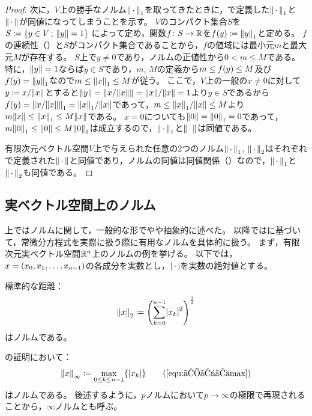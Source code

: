 \documentclass[b5paper,oneside,openany]{ltjsbook} %
\begin{document}
\begin{thm}
\begin{proof}
        次に，$V$上の勝手なノルム$\norm{\dummy}_1$を取ってきたときに，で定義した$\norm{\dummy}_1$と$\norm{\dummy}$が同値になってしまうことを示す。
        $V$のコンパクト集合$S$を$S\coloneqq \sset{y\in V}{\norm{y}=1}$
        によって定め，関数$f\colon S\to \mathbb{R}$を$\fun{f}{y}\coloneqq \norm{y}_1$と定める。
        $f$の連続性（）と$S$がコンパクト集合であることから，$f$の値域には最小元$m$と最大元$M$が存在する。
        $S$上で$y\ne {0}$であり，ノルムの正値性から$0<m\leq M$である。
        特に，$\norm{y}=1$ならば$y\in S$であり，$m$, $M$の定義から$m\leq \fun{f}{y}\leq M$及び$\fun{f}{y}=\norm{y}_1$なので$m\leq \norm{x}_1\leq M$が従う。
        ここで，$V$上の一般の$x\ne 0$に対して$y\coloneqq x / \norm{x}$とすると$\norm{y}=\norm{x/\norm{x}}=\norm{x}/\norm{x}=1$より$y\in S$であるから$\fun{f}{y}=\norm{x/\norm{x}}_1=\norm{x}_1/\norm{x}$であって，$m\leq \norm{x}_1/\norm{x}\leq M$より$m\norm{x}\leq \norm{x}_1\leq M\norm{x}$である。
        $x=0$についても$\norm{0}=\norm{0}_1=0$であって，$m \norm{0}_1\leq \norm{0}\leq M\norm{0}_1$は成立するので，$\norm{\dummy}_1$と$\norm{\dummy}$は同値である。

        有限次元ベクトル空間$V$上で与えられた任意の2つのノルム$\norm{\dummy}_1$, $\norm{\dummy}_2$はそれぞれで定義された$\norm{\dummy}$と同値であり，ノルムの同値は同値関係（）なので，$\norm{\dummy}_1$と$\norm{\dummy}_2$も同値である。
    \end{proof}
\end{thm}


\subsection{実ベクトル空間上のノルム}
上ではノルムに関して，一般的な形でやや抽象的に述べた。
以降では\cite{takano}に基づいて，常微分方程式を実際に扱う際に有用なノルムを具体的に扱う。
まず，有限次元実ベクトル空間$\mathbb{R}^n$上のノルムの例を挙げる。
以下では，$x=\pare{x_0,x_1,\dots,x_{n-1}}$の各成分を実数とし，$\abs{\dummy}$を実数の絶対値とする。

\begin{eg}[Euclidノルム]
    標準的な距離：
    \begin{equation}
        \norm{x}_2\coloneqq \pare{\sum_{k=0}^{n-1} \abs{x_k}^2}^{\frac{1}{2}}
    \end{equation}
    はノルムである。
\end{eg}

\begin{eg}[一様ノルム]
    の証明において：
    \begin{equation}
        \norm{x}_\infty \coloneqq \max_{0\leq k\leq n-1}\bra{\abs{x_k}}
        \tag{\ref{equ:ノルムmax}}
    \end{equation}
    はノルムである。
    後述するように，$p$ノルムにおいて$p\to\infty$の極限で再現されることから，$\infty$ノルムとも呼ぶ。
\end{eg}
\end{document}
